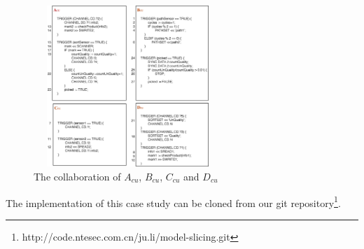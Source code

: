 \begin{figure}[!htb]
    \centering
        \includegraphics[height=2.4in, width=2.8in]{fig_four_collaborated_program}
    \caption{The collaboration of $A_{cu}$, $B_{cu}$, $C_{cu}$ and $D_{cu}$}\label{fig_four_collaborated_program}
\end{figure}

The implementation of this case study can be cloned from our git repository\footnote{http://code.ntesec.com.cn/ju.li/model-slicing.git}.
